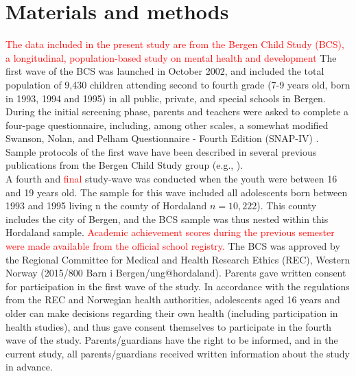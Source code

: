 \documentclass[10pt,letterpaper]{article}
\begin{document}
%

\section*{Materials and methods}
\textcolor{red}{The data included in the present study are from the Bergen Child Study (BCS), a longitudinal, population-based study on mental health and development}
The first wave of the BCS was launched in October 2002, and included the total population of 9,430 children attending second to fourth grade (7-9 years old, born in 1993, 1994 and 1995) in all public, private, and special schools in Bergen. 
During the initial screening phase, parents and teachers were asked to complete a four-page questionnaire, including, among other scales, a somewhat modified Swanson, Nolan, and Pelham Questionnaire - Fourth Edition (SNAP-IV) \cite{Swanson1992}.
Sample protocols of the first wave have been described in several previous publications from the Bergen Child Study group 
(e.g., \cite{Heiervang2007, Lundervold2011, Sivertsen2015}).\\

A fourth and \textcolor{red} {final} study-wave was conducted when the youth were between 16 and 19 years old. The sample for this wave included all adolescents born between 1993 and 1995 living n the county of Hordaland $n=10,222$). This county includes the city of Bergen, and the BCS sample was thus nested within this Hordaland sample. \textcolor{red} { Academic achievement scores  during the previous semester were made available from the official school registry.}  The BCS was approved by the Regional Committee for Medical and Health Research Ethics (REC), Western Norway (2015/800 Barn i Bergen/ung$@$hordaland). Parents gave written consent for participation in the first wave of the study. In accordance with the regulations from the REC and Norwegian health authorities, adolescents aged 16 years and older can make decisions regarding their own health (including participation in health studies), and thus gave consent themselves to participate in the fourth wave of the study. Parents/guardians have the right to be informed, and in the current study, all parents/guardians received written information about the study in advance.\\
\end{document}
